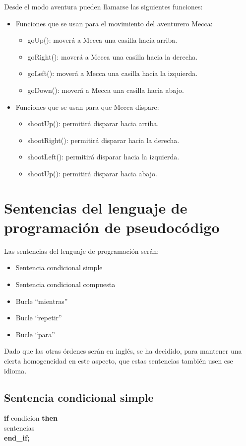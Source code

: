 \documentclass[a4paper,12pt,twoside,openright]{report}
\begin{document}
  Desde el modo aventura pueden llamarse las siguientes funciones:
  \begin{itemize}
   \item Funciones que se usan para el movimiento del aventurero Mecca:
   \begin{itemize}
    \item goUp(): moverá a Mecca una casilla hacia arriba.
    \item goRight(): moverá a Mecca una casilla hacia la derecha.
    \item goLeft(): moverá a Mecca una casilla hacia la izquierda.
    \item goDown(): moverá a Mecca una casilla hacia abajo.
   \end{itemize}
  \item Funciones que se usan para que Mecca dispare:
  \begin{itemize}
   \item shootUp(): permitirá disparar hacia arriba.
   \item shootRight(): permitirá disparar hacia la derecha.
   \item shootLeft(): permitirá disparar hacia la izquierda.
   \item shootUp(): permitirá disparar hacia abajo.
  \end{itemize}

  \end{itemize}


  
  \section{Sentencias del lenguaje de programación de pseudocódigo}
  Las sentencias del lenguaje de programación serán:
  \begin{itemize}
   \item Sentencia condicional simple
   \item Sentencia condicional compuesta
   \item Bucle ``mientras''
   \item Bucle ``repetir''
   \item Bucle ``para''
  \end{itemize}
  Dado que las otras órdenes serán en inglés, se ha decidido, para mantener una cierta homogeneidad en este aspecto, que 
  estas sentencias también usen ese idioma.
    \subsection{Sentencia condicional simple}
    \textbf{if} condicion \textbf{then}\\
      sentencias\\
    \textbf{end\_if;}
\end{document}
